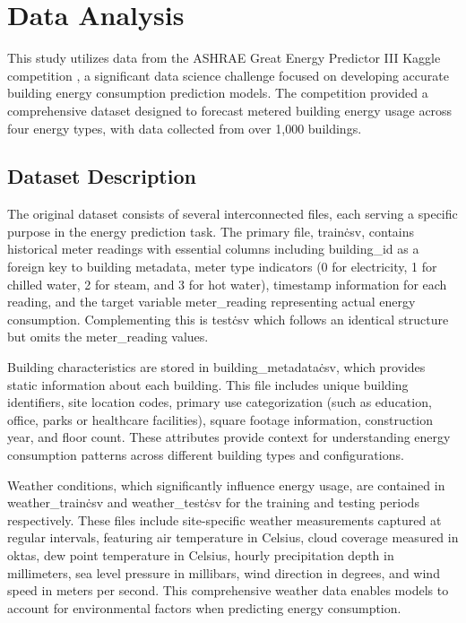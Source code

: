\section{Data Analysis}
\label{sec:Data Analyses}

This study utilizes data from the ASHRAE Great Energy Predictor III Kaggle competition \cite{ashrae-energy-prediction}, a significant data science challenge focused on developing accurate building energy consumption prediction models. The competition provided a comprehensive dataset designed to forecast metered building energy usage across four energy types, with data collected from over 1,000 buildings.

\subsection{Dataset Description}

The original dataset consists of several interconnected files, each serving a specific purpose in the energy prediction task. The primary file, train\.csv, contains historical meter readings with essential columns including building\_id as a foreign key to building metadata, meter type indicators (0 for electricity, 1 for chilled water, 2 for steam, and 3 for hot water), timestamp information for each reading, and the target variable meter\_reading representing actual energy consumption. Complementing this is test\.csv which follows an identical structure but omits the meter\_reading values.

Building characteristics are stored in building\_metadata\.csv, which provides static information about each building. This file includes unique building identifiers, site location codes, primary use categorization (such as education, office, parks or healthcare facilities), square footage information, construction year, and floor count. These attributes provide context for understanding energy consumption patterns across different building types and configurations.

Weather conditions, which significantly influence energy usage, are contained in weather\_train\.csv and weather\_test\.csv for the training and testing periods respectively. These files include site-specific weather measurements captured at regular intervals, featuring air temperature in Celsius, cloud coverage measured in oktas, dew point temperature in Celsius, hourly precipitation depth in millimeters, sea level pressure in millibars, wind direction in degrees, and wind speed in meters per second. This comprehensive weather data enables models to account for environmental factors when predicting energy consumption.


